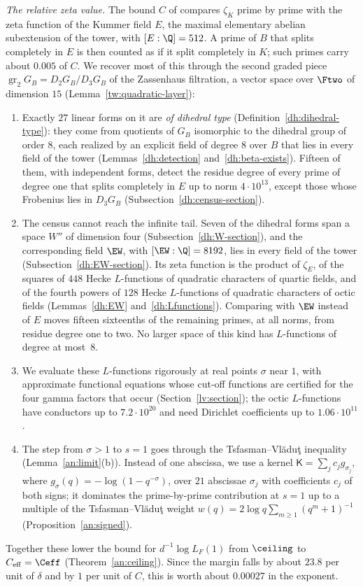 \emph{The relative zeta value.} The bound $C$ of \cite{Naslund04273}
compares $\zeta_K$ prime by prime with the zeta function of the Kummer
field $E$, the maximal elementary abelian subextension of the tower,
with $[E:\Q]=512$. A prime of $B$ that splits completely in $E$ is then
counted as if it split completely in $K$; such primes carry about $0.005$
of $C$. We recover most of this through the second graded piece
$\operatorname{gr}_2G_B=D_2G_B/D_3G_B$ of the Zassenhaus filtration, a
vector space over $\Ftwo$ of dimension $15$ (Lemma~\ref{tw:quadratic-layer}):
\begin{enumerate}
\item[(a)] Exactly $27$ linear forms on it are \emph{of dihedral type}
 (Definition~\ref{dh:dihedral-type}):
 they come from quotients of $G_B$ isomorphic to the dihedral group of
 order $8$, each realized by an explicit field of degree $8$ over $B$
 that lies in every field of the tower (Lemmas~\ref{dh:detection}
 and~\ref{dh:beta-exists}). Fifteen
 of them, with independent forms, detect the residue degree of every
 prime of degree one that splits completely in $E$ up to norm
 $4\cdot10^{13}$, except those whose Frobenius lies in $D_3G_B$
 (Subsection~\ref{dh:census-section}).
\item[(b)] The census cannot reach the infinite tail. Seven of the
 dihedral forms span a space $W''$ of dimension four
 (Subsection~\ref{dh:W-section}), and the corresponding field $\EW$, with
 $[\EW:\Q]=8192$, lies in every field of the tower
 (Subsection~\ref{dh:EW-section}). Its zeta function is
 the product of $\zeta_E$, of the squares of $448$ Hecke $L$-functions
 of quadratic characters of quartic fields, and of the fourth powers of
 $128$ Hecke $L$-functions of quadratic characters of octic fields
 (Lemmas~\ref{dh:EW} and~\ref{dh:Lfunctions}). Comparing with $\EW$ instead of $E$ moves fifteen
 sixteenths of the remaining primes, at all norms, from residue degree
 one to two. No larger space of this kind has $L$-functions of degree
 at most~$8$.
\item[(c)] We evaluate these $L$-functions rigorously at real points
 $\sigma$ near $1$, with approximate functional equations whose cut-off
 functions are certified for the four gamma factors that occur
 (Section~\ref{lv:section}); the octic $L$-functions have conductors up
 to $7.2\cdot10^{20}$ and need Dirichlet coefficients up to
 $1.06\cdot10^{11}$.
\item[(d)] The step from $\sigma>1$ to $s=1$ goes through the
 Tsfasman--Vl\u{a}du\c{t} inequality \cite[Proposition~3.1]{TsfasmanVladut2002}
 (Lemma~\ref{an:limit}(b)). Instead of one abscissa, we use a kernel
 $\mathsf K=\sum_jc_jg_{\sigma_j}$, where $g_\sigma(q)=-\log(1-q^{-\sigma})$,
 over $21$ abscissae $\sigma_j$ with coefficients $c_j$ of both signs;
 it dominates the prime-by-prime contribution at $s=1$ up to a multiple
 of the Tsfasman--Vl\u{a}du\c{t} weight
 $w(q)=2\log q\sum_{m\ge1}(q^m+1)^{-1}$ (Proposition~\ref{an:signed}).
\end{enumerate}
Together these lower the bound for $d^{-1}\log L_F(1)$ from $\ceiling$ to
$C_{\rm eff}=\Ceff$ (Theorem~\ref{an:ceiling}). Since the margin falls by
about $23.8$ per unit of $\delta$ and by $1$ per unit of $C$, this is
worth about $0.00027$ in the exponent.

